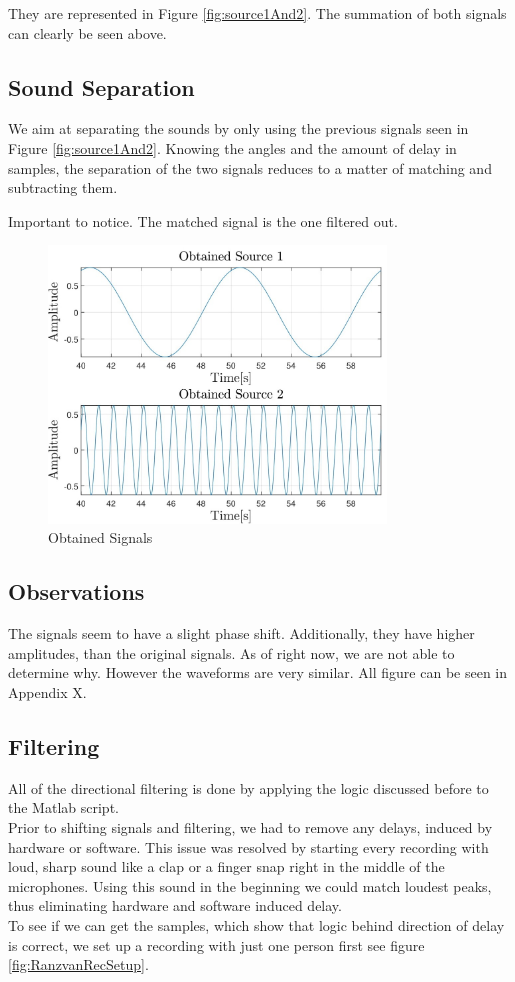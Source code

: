 They are represented in Figure \ref{fig:source1And2}. The summation of both signals can clearly 
be seen above.
\newpage
\subsection*{Sound Separation}
We aim at separating the sounds by only using the previous signals seen in Figure \ref{fig:source1And2}.
Knowing the angles and the amount of delay in samples, the separation of the two signals reduces to
a matter of matching and subtracting them. 

Important to notice. The matched signal is the one filtered out.
\begin{figure}[htp]
	\centering
	\includegraphics[width=0.8\textwidth]{Illustrations/obtainedSource1And2.jpg}
	\caption{Obtained Signals}
	\label{fig:obtainedSignals}
\end{figure}

\subsection*{Observations}
The signals seem to have a slight phase shift. Additionally, they have higher amplitudes, than the original
signals. As of right now, we are not able to determine why. However the waveforms are very similar.
All figure can be seen in Appendix X.
\newpage

\subsection{Filtering}
All of the directional filtering is done by applying the logic discussed before to the Matlab script.\\
Prior to shifting signals and filtering, we had to remove any delays, induced by hardware or software. This 
issue was resolved by starting every recording with loud, sharp sound like a clap or a finger snap right in 
the middle of the microphones. Using this sound in the beginning we could match loudest peaks, thus 
eliminating hardware and software induced delay. \\
To see if we can get the samples, which show that logic behind direction of delay is correct, we set up a 
recording with just one person first see figure \ref{fig:RanzvanRecSetup}.

